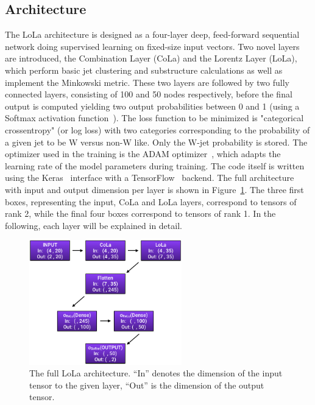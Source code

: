 \subsection{Architecture}
The LoLa architecture is designed as a four-layer deep, feed-forward sequential network doing supervised learning on fixed-size input vectors.
Two novel layers are introduced, the Combination Layer (CoLa) and the Lorentz Layer (LoLa), which perform basic jet clustering and substructure calculations as well as implement the Minkowski metric. These two layers are followed by two fully connected layers, consisting of 100 and 50 nodes respectively, before the final output is computed yielding two output probabilities between 0 and 1 (using a Softmax activation function~\cite{Goodfellow:2016:DL:3086952}). The loss function to be minimized is "categorical crossentropy" (or log loss) with two categories corresponding to the probability of a given jet to be W versus non-W like. Only the W-jet probability is stored.
The optimizer used in the training is the ADAM optimizer~\cite{DBLP:journals/corr/KingmaB14}, which adapts the learning rate of the model parameters during training. The code itself is written using the Keras~\cite{chollet2015keras} interface with a TensorFlow~\cite{tensorflow2015-whitepaper} backend.
The full architecture with input and output dimension per layer is shown in Figure~\ref{fig:lola:arch}. The three first boxes, representing the input, CoLa and LoLa layers, correspond to tensors of rank 2, while the final four boxes correspond to tensors of rank 1. In the following, each layer will be explained in detail.
\begin{figure}[h!]
\centering
\includegraphics[width=0.59\textwidth]{figures/vtagging/misc/architecture.png}
\caption{The full LoLa architecture. ``In'' denotes the dimension of the input tensor to the given layer, ``Out'' is the dimension of the output tensor.}
\label{fig:lola:arch}
\end{figure}


